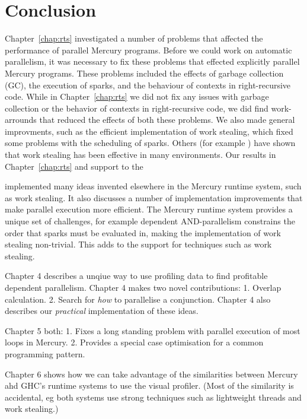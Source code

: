 
\chapter{Conclusion}
\label{chap:conc}


Chapter~\ref{chap:rts}
investigated a number of problems that affected the performance of parallel
Mercury programs.
Before we could work on automatic parallelism,
it was necessary to fix these problems that effected explicitly parallel
Mercury programs.
These problems included the effects of garbage collection (GC),
the execution of sparks,
and the behaviour of contexts in right-recursive code.
While in Chapter~\ref{chap:rts} we did not fix any issues with garbage
collection or
the behavior of contexts in right-recursive code,
we did find work-arrounds that reduced the effects of both these problems.
We also made general improvments, such as the efficient implementation of
work stealing,
which fixed some problems with the scheduling of sparks.
Others (for example \citet{halstead}) have shown that work stealing has been effective in many environments.
Our results in Chapter~\ref{chap:rts} and support to the 

implemented many ideas invented elsewhere in the Mercury
runtime system, such as work stealing.
It also discusses a number of implementation improvements that make
parallel execution more efficient.
The Mercury runtime system provides a unique set of challenges, for
example dependent AND-parallelism constrains the order that sparks must
be evaluated in, making the implementation of work stealing non-trivial.
This adds to the support for techniques such as work stealing.

    Chapter 4 describes a unqiue way to use profiling data to find
    profitable dependent parallelism.
    Chapter 4 makes two novel contributions:
        1. Overlap calculation.
        2. Search for \emph{how} to parallelise a conjunction.
    Chapter 4 also describes our \emph{practical} implementation
    of these ideas.

    Chapter 5 both:
        1. Fixes a long standing problem with parallel execution of most
        loops in Mercury.
        2. Provides a special case optimisation for a common programming
        pattern.

    Chapter 6 shows how we can take advantage of the similarities between
    Mercury ahd GHC's runtime systems to use the \tscope visual profiler.
    (Most of the similarity is accidental, eg both systems use strong
    techniques such as lightweight threads and work stealing.)

